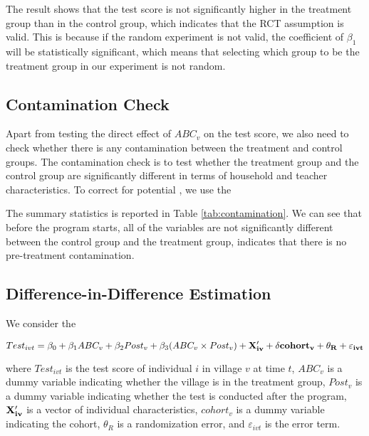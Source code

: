 \documentclass[12pt]{jfm}
\begin{document}
The result shows that the test score is not significantly higher in the treatment group than in the control group, which indicates that the RCT assumption is valid. This is because if the random experiment is not valid, the coefficient of $\beta_1$ will be statistically significant, which means that selecting which group to be the treatment group in our experiment is not random.

\subsection{Contamination Check} \label{subsec:contamination}

Apart from testing the direct effect of $ABC_{v}$ on the test score, we also need to check whether there is any contamination between the treatment and control groups. The contamination check is to test whether the treatment group and the control group are significantly different in terms of household and teacher characteristics. To correct for potential , we use the 

The summary statistics is reported in Table \ref{tab:contamination}. We can see that before the program starts, all of the variables are not significantly different between the control group and the treatment group, indicates that there is no pre-treatment contamination. 


\subsection{Difference-in-Difference Estimation} \label{subsec:did}

We consider the 

\begin{equation}
 Test_{ivt} = \beta_0 + \beta_1 ABC_{v} + \beta_2 Post_{v} + \beta_3 (ABC_v \times Post_v) + \bf{X}_{iv}^\prime + \delta cohort_{v} + \theta_R + \varepsilon_{ivt} \label{eq:did_baseline}  
\end{equation}

where $Test_{ivt}$ is the test score of individual $i$ in village $v$ at time $t$, $ABC_v$ is a dummy variable indicating whether the village is in the treatment group, $Post_v$ is a dummy variable indicating whether the test is conducted after the program, $\bf{X}_{iv}^\prime$ is a vector of individual characteristics, $cohort_{v}$ is a dummy variable indicating the cohort, $\theta_R$ is a randomization error, and $\varepsilon_{ivt}$ is the error term.
\end{document}
